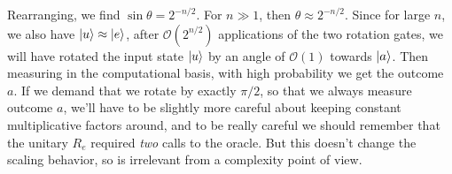 \documentclass[]{article}
\theoremstyle{plain}
\theoremstyle{definition}
\theoremstyle{remark}
\begin{document}
Rearranging, we find $\sin\theta=2^{-n/2}$. For $n\gg 1$, then $\theta\approx 2^{-n/2}$. Since for large $n$, we also have ${\left\vert{u}\right\rangle}\approx{\left\vert{e}\right\rangle}$, after $\mathcal{O}\left(2^{n/2}\right)$ applications of the two rotation gates, we will have rotated the input state ${\left\vert{u}\right\rangle}$ by an angle of $\mathcal{O}(1)$ towards ${\left\vert{a}\right\rangle}$. Then measuring in the computational basis, with high probability we get the outcome $a$. If we demand that we rotate by exactly $\pi/2$, so that we always measure outcome $a$, we'll have to be slightly more careful about keeping constant multiplicative factors around, and to be really careful we should remember that the unitary $R_e$ required \textit{two} calls to the oracle. But this doesn't change the scaling behavior, so is irrelevant from a complexity point of view.
\end{document}

